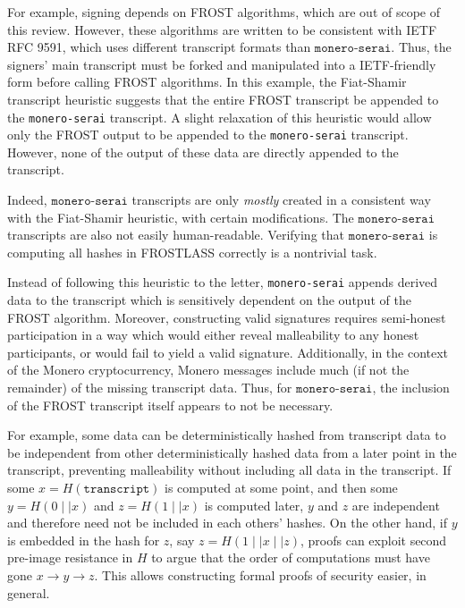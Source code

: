 \documentclass[12pt,a4paper]{article}
\begin{document}
\begin{itemize}
    For example, signing depends on FROST algorithms, which are out of scope of this review. However, these algorithms are written to be consistent with IETF RFC 9591, which uses different transcript formats than $\texttt{monero-serai}$. Thus, the signers' main transcript must be forked and manipulated into a IETF-friendly form before calling FROST algorithms.
    In this example, the Fiat-Shamir transcript heuristic suggests that the entire FROST transcript be appended to the \texttt{monero-serai} transcript. A slight relaxation of this heuristic would allow only the FROST output to be appended to the \texttt{monero-serai} transcript.
    However, none of the output of these data are directly appended to the transcript.

    Indeed, $\texttt{monero-serai}$  transcripts are only \textit{mostly} created in a consistent way with the Fiat-Shamir heuristic,  with certain modifications. The $\texttt{monero-serai}$ transcripts are also not easily human-readable. Verifying that $\texttt{monero-serai}$ is computing all hashes in FROSTLASS correctly is a nontrivial task.

    Instead of following this heuristic to the letter, \texttt{monero-serai} appends derived data to the transcript which is sensitively dependent on the output of the FROST algorithm. Moreover, constructing valid signatures requires semi-honest participation in a way which would either reveal malleability to any honest participants, or would fail to yield a valid signature. Additionally, in the context of the Monero cryptocurrency, Monero messages include much (if not the remainder) of the missing transcript data. Thus, for $\texttt{monero-serai}$, the inclusion of the FROST transcript itself appears to not be necessary.

    For example, some data can be deterministically hashed from transcript data to be independent from other deterministically hashed data from a later point in the transcript, preventing malleability without including all data in the transcript. If some $x = H(\texttt{transcript})$ is computed at some point, and then some $y = H(0 \mid \mid x)$ and $z = H(1 \mid \mid x)$ is computed later, $y$ and $z$ are independent and therefore need not be included in each others' hashes.
    On the other hand, if $y$ is embedded in the hash for $z$, say $z = H(1 \mid \mid x \mid \mid z)$, proofs can exploit second pre-image resistance in $H$ to argue that the order of computations must have gone $x \to y \to z$. This allows constructing formal proofs of security easier, in general.


\end{itemize}
\end{document}
